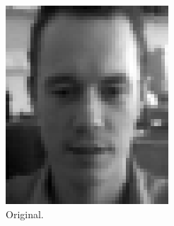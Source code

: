 \documentclass[a4paper, 10pt, conference]{ieeeconf}
\begin{document}
\begin{figure}[!ht]
	\captionsetup[subfigure]{position=b}
        \centering
        \begin{subfigure}{0.1\textwidth}
        \includegraphics[width=\textwidth]{src/face2.png}
                \caption{Original.}
        \end{subfigure}
        ~
        \begin{subfigure}{0.1\textwidth}

\end{subfigure}
\end{figure}
\end{document}
